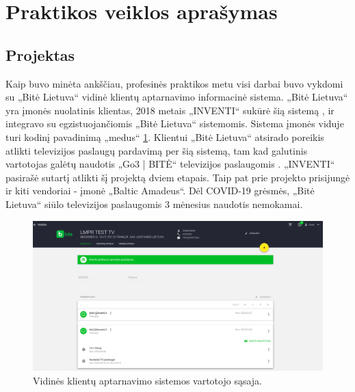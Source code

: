 \section{Praktikos veiklos aprašymas}

\subsection{Projektas}
Kaip buvo minėta ankščiau, profesinės praktikos metu visi darbai buvo vykdomi su „Bitė Lietuva“ vidinė klientų aptarnavimo informacinė sistema.
„Bitė Lietuva“ yra įmonės nuolatinis klientas, 2018 metais „INVENTI“ sukūrė šią sistemą \cite{medus}, ir integravo su egzistuojančiomis „Bitė Lietuva“ sistemomis.
Sistema įmonės viduje turi kodinį pavadinimą „medus“ \ref{img:medus}.
Klientui „Bitė Lietuva“ atsirado poreikis atlikti televizijos paslaugų pardavimą per šią sistemą, tam kad galutinis vartotojas galėtų naudotis
„Go3 | BITĖ“ televizijos paslaugomis \cite{go3}. „INVENTI“ pasirašė sutartį atlikti šį projektą dviem etapais.
Taip pat prie projekto prisijungė ir kiti vendoriai - įmonė „Baltic Amadeus“. Dėl COVID-19 grėsmės, „Bitė Lietuva“ siūlo televizijos paslaugomis 3 mėnesius naudotis nemokamai.


\begin{figure}[H]
    \centering
    \includegraphics[scale=0.25]{img/medus.png}
    \caption{Vidinės klientų aptarnavimo sistemos vartotojo sąsaja.}
    \label{img:medus}
\end{figure}

